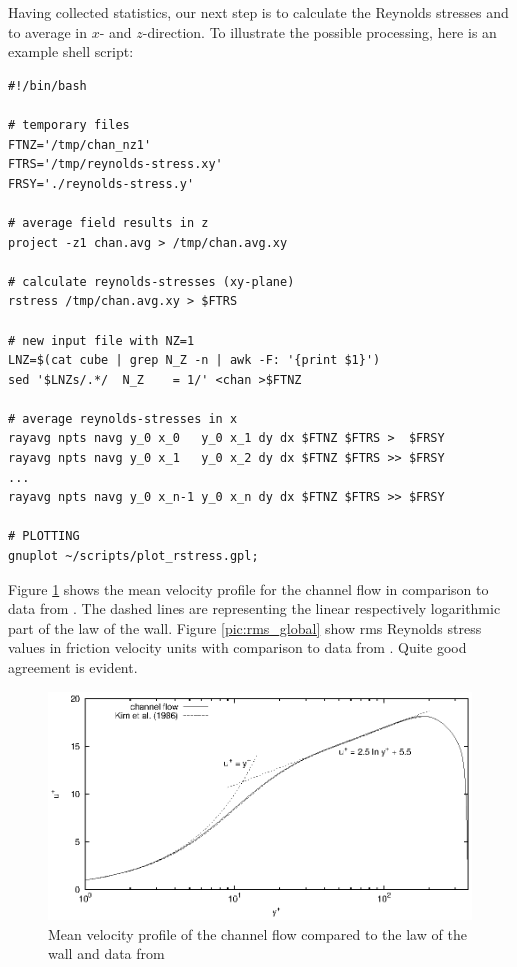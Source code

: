 \documentclass[11pt,a4paper]{report}
\begin{document}
Having collected statistics, our next step is to calculate the
Reynolds stresses and to average in $x$- and $z$-direction. To
illustrate the possible processing, here is an example shell script:

{\small
\begin{verbatim}
#!/bin/bash

# temporary files
FTNZ='/tmp/chan_nz1'
FTRS='/tmp/reynolds-stress.xy'
FRSY='./reynolds-stress.y'

# average field results in z
project -z1 chan.avg > /tmp/chan.avg.xy

# calculate reynolds-stresses (xy-plane)
rstress /tmp/chan.avg.xy > $FTRS

# new input file with NZ=1
LNZ=$(cat cube | grep N_Z -n | awk -F: '{print $1}')
sed '$LNZs/.*/  N_Z    = 1/' <chan >$FTNZ

# average reynolds-stresses in x
rayavg npts navg y_0 x_0   y_0 x_1 dy dx $FTNZ $FTRS >  $FRSY
rayavg npts navg y_0 x_1   y_0 x_2 dy dx $FTNZ $FTRS >> $FRSY
...
rayavg npts navg y_0 x_n-1 y_0 x_n dy dx $FTNZ $FTRS >> $FRSY

# PLOTTING
gnuplot ~/scripts/plot_rstress.gpl;
\end{verbatim}
}

Figure \ref{pic:u_wall} shows the mean velocity profile for the
channel flow in comparison to data from \citet{kmm87}. The dashed
lines are representing the linear respectively logarithmic part of the
law of the wall.  Figure \ref{pic:rms_global} show rms Reynolds stress
values in friction velocity units with comparison to data from
\citet{kmm87}.  Quite good agreement is evident.

\begin{figure}
\centering
\includegraphics[width=0.7\linewidth]{dns_u_wall.ps}
\caption{Mean velocity profile of the channel flow compared to the law
  of the wall and data from \citet{kmm87}}
\label{pic:u_wall}
\end{figure}
\end{document}
